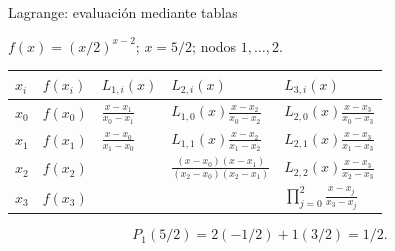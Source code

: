 \documentclass[main.tex]{subfiles}
\begin{document}
\begin{frame}[t]{Lagrange: evaluación mediante tablas}
\par\noindent\begin{minipage}[t][12mm][t]{\textwidth}\small\strut $f(x)=(x/2)^{x-2}$; $x=5/2$; nodos $1,\ldots,2$.\end{minipage}\par\nointerlineskip
\begin{minipage}[t]{\textwidth}\begingroup\scriptsize\setlength{\tabcolsep}{3pt}\begin{center}\begin{tabular}{|C{.065\textwidth}|C{.095\textwidth}|C{.19\textwidth}|C{.25\textwidth}|C{.25\textwidth}|}\hline
\rule[-2mm]{0pt}{6mm}$x_i$&$f(x_i)$&$L_{1,i}(x)$&$L_{2,i}(x)$&$L_{3,i}(x)$\\\hline
\rule[-2.5mm]{0pt}{9mm}$x_0$&$f(x_0)$&$\frac{x-x_1}{x_0-x_1}$&$L_{1,0}(x)\frac{x-x_2}{x_0-x_2}$&$L_{2,0}(x)\frac{x-x_3}{x_0-x_3}$\\\hline
\rule[-2.5mm]{0pt}{9mm}$x_1$&$f(x_1)$&$\frac{x-x_0}{x_1-x_0}$&$L_{1,1}(x)\frac{x-x_2}{x_1-x_2}$&$L_{2,1}(x)\frac{x-x_3}{x_1-x_3}$\\\hline
\rule[-2.5mm]{0pt}{9mm}$x_2$&$f(x_2)$&&$\frac{(x-x_0)(x-x_1)}{(x_2-x_0)(x_2-x_1)}$&$L_{2,2}(x)\frac{x-x_3}{x_2-x_3}$\\\hline
\rule[-2.5mm]{0pt}{9mm}$x_3$&$f(x_3)$&&&$\prod_{j=0}^2\frac{x-x_j}{x_3-x_j}$\\\hline
\end{tabular}\end{center}\endgroup\par
\end{minipage}\par\[P_1(5/2)=2(-1/2)+1(3/2)=1/2.\]
\end{frame}
\end{document}
